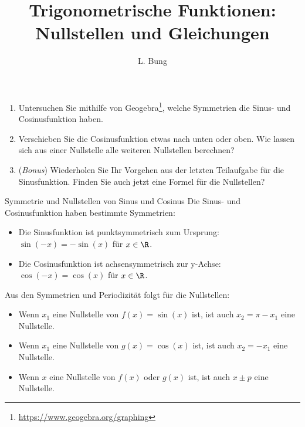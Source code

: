 \documentclass[11pt, a4paper, oneside]{article}
\begin{document}
	\author{L. Bung}
	\title{Trigonometrische Funktionen: Nullstellen und Gleichungen}
	\subject{Mathematik}
	\maketitle
	
	
	\begin{enumerate}[label=\alph*)]
		\item Untersuchen Sie mithilfe von Geogebra\footnote{\url{https://www.geogebra.org/graphing}}, welche Symmetrien die Sinus- und Cosinusfunktion haben.\\
		
		\checkered[4cm]
		
		\item Verschieben Sie die Cosinusfunktion etwas nach unten oder oben.
		Wie lassen sich aus einer Nullstelle alle weiteren Nullstellen berechnen?\\
		
		\checkered[4cm]
		
		\item (\textit{Bonus}) Wiederholen Sie Ihr Vorgehen aus der letzten Teilaufgabe für die Sinusfunktion.
		Finden Sie auch jetzt eine Formel für die Nullstellen?\\
		
		\checkered[4cm]
	\end{enumerate}
	
	\begin{hint}{Symmetrie und Nullstellen von Sinus und Cosinus}
		Die Sinus- und Cosinusfunktion haben bestimmte Symmetrien:
		
		\begin{itemize}
			\item Die Sinusfunktion ist punktsymmetrisch zum Ursprung: $\sin(-x) = -\sin(x)$ für $x \in \R$.
			\item Die Cosinusfunktion ist achsensymmetrisch zur y-Achse: $\cos(-x) = \cos(x)$ für $x \in \R$.
		\end{itemize}
		
		Aus den Symmetrien und Periodizität folgt für die Nullstellen:
		
		\begin{itemize}
			\item Wenn $x_1$ eine Nullstelle von $f(x)=\sin(x)$ ist, ist auch $x_2 = \pi - x_1$ eine Nullstelle.
			\item Wenn $x_1$ eine Nullstelle von $g(x)=\cos(x)$ ist, ist auch $x_2 = -x_1$ eine Nullstelle.
			\item Wenn $x$ eine Nullstelle von $f(x)$ oder $g(x)$ ist, ist auch $x \pm p$ eine Nullstelle.
		\end{itemize}
	\end{hint}
	
\end{document}
